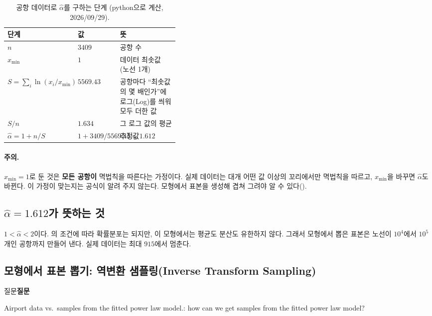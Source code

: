 \documentclass[11pt]{article}
\newenvironment{callout}[1][]
  {\par\medskip\noindent
   \begin{lrbox}{\calloutbox}\begin{minipage}{0.92\linewidth}
   \def\calloutttl{#1}\ifx\calloutttl\empty\else\textbf{#1}\par\smallskip\fi}
  {\end{minipage}\end{lrbox}%
   \fcolorbox{black!30}{black!3}{\usebox{\calloutbox}}\par\medskip}
\newcommand{\term}[1]{\textbf{#1}}
\begin{document}
\begin{table}[H]
  \centering
  \caption{공항 데이터로 $\hat\alpha$를 구하는 단계 (python으로 계산, 2026/09/29).}
  \label{tab:p1a-alpha-steps}
  \begin{tabular}{llp{0.4\linewidth}}
    \toprule
    단계 & 값 & 뜻 \\
    \midrule
    $n$ & $3409$ & 공항 수 \\
    \midrule
    $x_{\min}$ & $1$ & 데이터 최솟값 (노선 1개) \\
    \midrule
    $S = \sum_i \ln(x_i / x_{\min})$ & $5569.43$
      & 공항마다 ``최솟값의 몇 배인가''에 로그(Log)를 씌워 모두 더한 값 \\
    \midrule
    $S / n$ & $1.634$ & 그 로그 값의 평균 \\
    \midrule
    $\hat\alpha = 1 + n / S$ & $1 + 3409 / 5569.43 = 1.612$ & 추정값 \\
    \bottomrule
  \end{tabular}
\end{table}

\paragraph{주의.} $x_{\min} = 1$로 둔 것은 \term{모든 공항이} 멱법칙을 따른다는 가정이다.
실제 데이터는 대개 어떤 값 이상의 꼬리에서만 멱법칙을 따르고, $x_{\min}$을 바꾸면
$\hat\alpha$도 바뀐다. 이 가정이 맞는지는 공식이 알려 주지 않는다. 모형에서 표본을
생성해 겹쳐 그려야 알 수 있다().

\subsection{$\hat\alpha = 1.612$가 뜻하는 것}
$1 < \hat\alpha < 2$이다. 의 조건에 따라 확률분포는 되지만,
이 모형에서는 평균도 분산도 유한하지 않다. 그래서 모형에서 뽑은 표본은
노선이 $10^4$에서 $10^5$개인 공항까지 만들어 낸다. 실제 데이터는 최대
$915$에서 멈춘다.

\subsection{모형에서 표본 뽑기: 역변환 샘플링(Inverse Transform Sampling)}
\label{sec:p1a-sample}

\begin{callout}[질문]
Airport data vs.\ samples from the fitted power law model.: how can we get samples
from the fitted power law model?
\end{callout}
\end{document}
